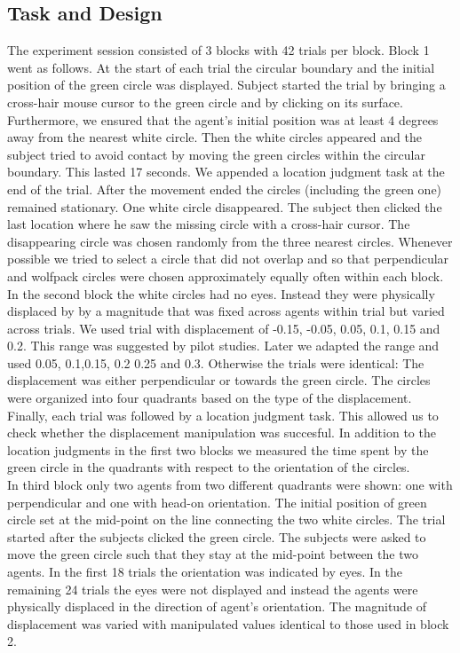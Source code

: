 \documentclass{article}
\begin{document}
\subsection{Task and Design}
The experiment session consisted of 3 blocks with 42 trials per block. Block 1 went as follows. At the start of each trial the circular boundary and the initial position of the green circle was displayed. Subject started the trial by bringing a cross-hair mouse cursor to the green circle and by clicking on its surface. Furthermore, we ensured that the agent's initial position was at least 4 degrees away from the nearest white circle. Then the white circles appeared and the subject tried to avoid contact by moving the green circles within the circular boundary. This lasted 17 seconds. We appended a location judgment task at the end of the trial. After the movement ended the circles (including the green one) remained stationary. One white circle disappeared. The subject then clicked the last location where he saw the missing circle with a cross-hair cursor. The disappearing circle was chosen randomly from the three nearest circles. Whenever possible we tried to select a circle that did not overlap and so that perpendicular and wolfpack circles were chosen approximately equally often within each block. \\
In the second block the white circles had no eyes. Instead they were physically displaced by by a magnitude that was fixed across agents within trial but varied across trials. We used trial with displacement of -0.15, -0.05, 0.05, 0.1, 0.15 and 0.2. This range was suggested by pilot studies. Later we adapted the range and used 0.05, 0.1,0.15, 0.2 0.25 and 0.3. Otherwise the trials were identical: The displacement was either perpendicular or towards the green circle. The circles were organized into four quadrants based on the type of the displacement. Finally, each trial was followed by a location judgment task. This allowed us to check whether the displacement manipulation was succesful. In addition to the location judgments in the first two blocks we measured the time spent by the green circle in the quadrants with respect to the orientation of the circles.\\
In third block only two agents from two different quadrants were shown: one with perpendicular and one with head-on orientation. The initial position of green circle set at the mid-point on the line connecting the two white circles. The trial started after the subjects clicked the green circle. The subjects were asked to move the green circle such that they stay at the mid-point between the two agents. In the first 18 trials the orientation was indicated by eyes. In the remaining 24 trials the eyes were not displayed and instead the agents were physically displaced in the direction of agent's orientation. The magnitude of displacement was varied with manipulated values identical to those used in block 2.\\
\end{document}
